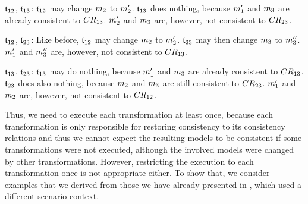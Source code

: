 \begin{properdescription}
    \item[$\mathfrak{t}_{12}$, $\mathfrak{t}_{13}$:] 
    $\mathfrak{t}_{12}$ may change $m_{2}$ to $m_{2}'$. $\mathfrak{t}_{13}$ does nothing, because $m_{1}'$ and $m_{3}$ are already consistent to $CR_{13}$.
    $m_{2}'$ and $m_{3}$ are, however, not consistent to $CR_{23}$.
    \item[$\mathfrak{t}_{12}$, $\mathfrak{t}_{23}$:] 
    Like before, $\mathfrak{t}_{12}$ may change $m_{2}$ to $m_{2}'$. 
    $\mathfrak{t}_{23}$ may then change $m_{3}$ to $m_{3}''$. 
    $m_{1}'$ and $m_{3}''$ are, however, not consistent to $CR_{13}$.
    \item[$\mathfrak{t}_{13}$, $\mathfrak{t}_{23}$:]
    $\mathfrak{t}_{13}$ may do nothing, because $m_{1}'$ and $m_{3}$ are already consistent to $CR_{13}$.
    $\mathfrak{t}_{23}$ does also nothing, because $m_{2}$ and $m_{3}$ are still consistent to $CR_{23}$.
    $m_{1}'$ and $m_{2}$ are, however, not consistent to $CR_{12}$.
\end{properdescription}

Thus, we need to execute each transformation at least once, because each transformation is only responsible for restoring consistency to its consistency relations and thus we cannot expect the resulting models to be consistent if some transformations were not executed, although the involved models were changed by other transformations.
However, restricting the execution to each transformation once is not appropriate either.
To show that, we consider examples that we derived from those we have already presented in , which used a different scenario context.


